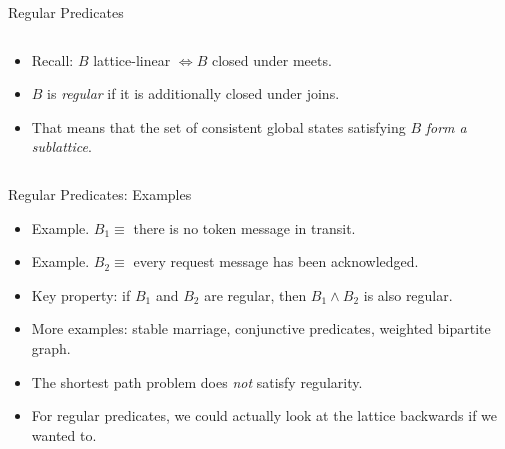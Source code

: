 \documentclass{beamer}
\begin{document}
\begin{frame}{Regular Predicates}
\begin{columns}[T]
\begin{column}{0.48\linewidth}
\begin{itemize}
    \item Recall: $B$ lattice-linear $\Longleftrightarrow B$ closed under meets.
    \item $B$ is \emph{regular} if it is additionally closed under joins.
    \item That means that the set of consistent global states satisfying
    $B$ \emph{form a sublattice}.
\end{itemize}
\end{column}
\begin{column}{0.48\linewidth}
\end{column}
\end{columns}
\end{frame}

\begin{frame}{Regular Predicates: Examples}
\begin{itemize}
    \item Example. $B_1 \equiv $ there is no token message in transit.
    \item Example. $B_2 \equiv $ every request message has been acknowledged.
    \item Key property: if $B_1$ and $B_2$ are regular, then $B_1 \wedge B_2$
    is also regular.
    \item More examples: stable marriage, conjunctive predicates,
    weighted bipartite graph.
    \item The shortest path problem does \emph{not} satisfy regularity.
    \item For regular predicates, we could actually look at the lattice backwards
    if we wanted to.
\end{itemize}
    
\end{frame}
\end{document}
